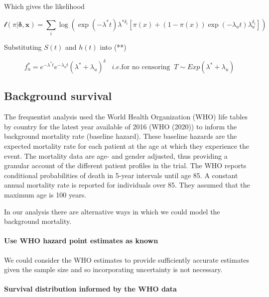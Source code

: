 \documentclass[
]{article}
\begin{document}
Which gives the likelihood

\[
\mathcal{l}(\pi | \boldsymbol{\delta}, \boldsymbol{x}) =
 \sum_i \log(\exp(-\lambda^* t) \lambda^{* \delta_i}[\pi(x) +
   (1 − \pi(x)) \exp(-\lambda_u t) \lambda_u^{\delta_i}])
\]

Substituting \(S(t)\) and \(h(t)\) into (**)

\[
f^*_u = e^{-\lambda^* t} e^{-\lambda_u t} (\lambda^* + \lambda_u)^{\delta} \;\;\; i.e. \mbox{for no censoring} \;\; T \sim Exp(\lambda^* + \lambda_u)
\]

\hypertarget{background-survival}{%
\subsection{Background survival}\label{background-survival}}

The frequentist analysis used the World Health Organization (WHO) life
tables by country for the latest year available of 2016 (WHO (2020)) to
inform the background mortality rate (baseline hazard). These baseline
hazards are the expected mortality rate for each patient at the age at
which they experience the event. The mortality data are age- and gender
adjusted, thus providing a granular account of the different patient
profiles in the trial. The WHO reports conditional probabilities of
death in 5-year intervals until age 85. A constant annual mortality rate
is reported for individuals over 85. They assumed that the maximum age
is 100 years.

In our analysis there are alternative ways in which we could model the
background mortality.

\hypertarget{use-who-hazard-point-estimates-as-known}{%
\paragraph{Use WHO hazard point estimates as
known}\label{use-who-hazard-point-estimates-as-known}}

We could consider the WHO estimates to provide sufficiently accurate
estimates given the sample size and so incorporating uncertainty is not
necessary.

\hypertarget{survival-distribution-informed-by-the-who-data}{%
\paragraph{Survival distribution informed by the WHO
data}\label{survival-distribution-informed-by-the-who-data}}
\end{document}
